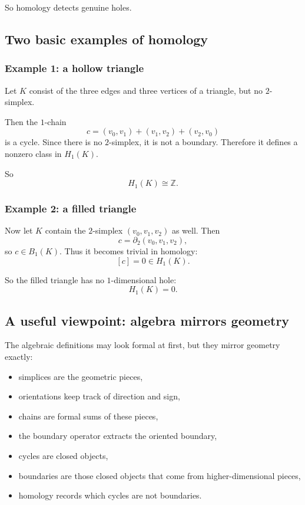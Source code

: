 \documentclass[12pt,a4paper]{article}
\theoremstyle{notespace}
\begin{document}
So homology detects genuine holes.

\subsection{Two basic examples of homology}

\subsubsection*{Example 1: a hollow triangle}

Let \(K\) consist of the three edges and three vertices of a triangle, but no \(2\)-simplex.

Then the \(1\)-chain
\[
c=(v_0,v_1)+(v_1,v_2)+(v_2,v_0)
\]
is a cycle. Since there is no \(2\)-simplex, it is not a boundary. Therefore it defines a nonzero class in \(H_1(K)\).

So
\[
H_1(K)\cong \mathbb{Z}.
\]

\subsubsection*{Example 2: a filled triangle}

Now let \(K\) contain the \(2\)-simplex \((v_0,v_1,v_2)\) as well. Then
\[
c=\partial_2(v_0,v_1,v_2),
\]
so \(c\in B_1(K)\). Thus it becomes trivial in homology:
\[
[c]=0 \in H_1(K).
\]

So the filled triangle has no \(1\)-dimensional hole:
\[
H_1(K)=0.
\]

\subsection{A useful viewpoint: algebra mirrors geometry}

The algebraic definitions may look formal at first, but they mirror geometry exactly:

\begin{itemize}
	\item simplices are the geometric pieces,
	\item orientations keep track of direction and sign,
	\item chains are formal sums of these pieces,
	\item the boundary operator extracts the oriented boundary,
	\item cycles are closed objects,
	\item boundaries are those closed objects that come from higher-dimensional pieces,
	\item homology records which cycles are not boundaries.
\end{itemize}
\end{document}
